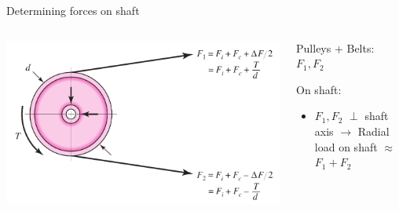 \documentclass[10pt, svgnames]{beamer}
\begin{document}
\begin{frame}[label={sec:org543d0f2}]{Determining forces on shaft}
\begin{columns}
\begin{column}{0.6\columnwidth}
\begin{center}
\includegraphics[width=.9\linewidth]{./pictures/forces-on-pulley.png}
\end{center}
\end{column}

\begin{column}{0.5\columnwidth}
Pulleys + Belts: \(F_{1}, F_{2}\)

On shaft:

\begin{itemize}
\item \(F_{1}, F_{2}\) \(\perp\) shaft axis \(\rightarrow\) Radial load on shaft \(\approx\) \(F_{1} + F_{2}\)
\end{itemize}
\end{column}
\end{columns}
\end{frame}
\end{document}
